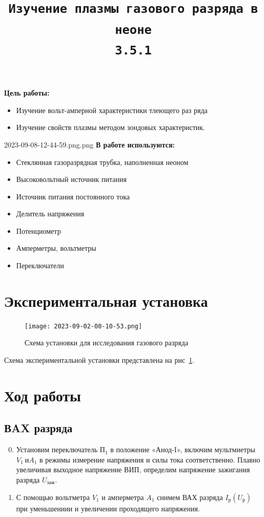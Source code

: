 \documentclass[11pt,a4paper]{article}
\title{\texttt{Изучение плазмы газового разряда в неоне \\ 3.5.1}}
\author{}
\date{}
\begin{document}
\maketitle

\textbf{Цель работы:}
\begin{itemize}
  \item  Изучение вольт-амперной характеристики тлеющего раз­
  ряда
  \item Изучение свойств плазмы методом зондовых характеристик.
\end{itemize}
2023-09-08-12-44-59.png.png
\textbf{В работе используются:}  
\begin{itemize}
  \item Стеклянная газоразрядная трубка, наполнен­ная неоном
  \item Высоковольтный источник питания
  \item Источник питания посто­янного тока
  \item Делитель напряжения
  \item Потенциометр
  \item Амперметры, вольтметры
  \item Переключатели
\end{itemize}

\section*{Экспериментальная установка}

\begin{figure}[h!]
  \texttt{[image: 2023-09-02-00-10-53.png]}
  \caption{Схема установки для исследования газового разряда}
  \label{fig:ust}
\end{figure}

\noindent Схема экспериментальной установки представлена на рис~\ref{fig:ust}.
  
\section*{Ход работы}
\subsection*{ВAX разряда}
\begin{enumerate}
  \setcounter{enumi}{-1}
  \item Установим переключатель $П_1$ в положение «Анод-I», включим
  мультмиетры $V_1\ и A_1$ в режимы измерение напряжения и силы тока соответственно.
  Плав­но увеличивая выходное напряжение ВИП, определим
  напряжение зажигания разряда $U_\text{заж}$.
  \item С помощью вольтметра $V_1$ и амперметра $A_1$ снимем 
  ВАХ разряда $I_\text{р}(U_\text{р})$ при уменьшениии и увеличении 
  проходящего напряжения.
\end{enumerate}
\end{document}
